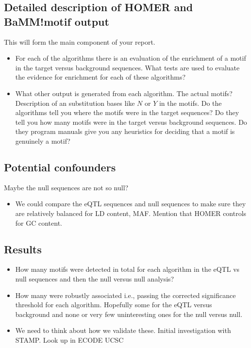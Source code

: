 \documentclass[12pt, onecolumn, oneside]{gsajnl}
\begin{document}
\subsection{Detailed description of HOMER and  BaMM!motif output}

This will form the main component of your report.

\begin{itemize}
\item For each of the algorithms there is an evaluation of the enrichment of a motif in the target versus background sequences. What tests are used to
evaluate the evidence for enrichment for each of these algorithms? 
\item What other output is generated from each algorithm. The actual motifs? Description of an substitution bases like $N$ or $Y$ in the motifs. Do the
algorithms tell you where the motifs were in the target sequences? Do they tell you how many motifs were in the target versus background sequences.
Do they program manuals give you any heuristics for deciding that a motif is genuinely a motif?
\end{itemize}

\subsection{Potential confounders}

Maybe the null sequences are not so null?

\begin{itemize}
\item We could compare the eQTL sequences and null sequences to make sure they are relatively balanced for LD content, MAF. Mention that HOMER controls for GC content. 
\end{itemize}

\subsection{Results}

\begin{itemize}
\item How many motifs were detected in total for each algorithm in the eQTL vs null sequences and then the null versus null analysis?
\item How many were robustly associated i.e., passing the corrected significance threshold for each algorithm. Hopefully some for the eQTL versus background
and none or very few uninteresting ones for the null versus null.
\item We need to think about how we validate these. Initial investigation with STAMP. Look up in ECODE UCSC
\end{itemize}
\end{document}
